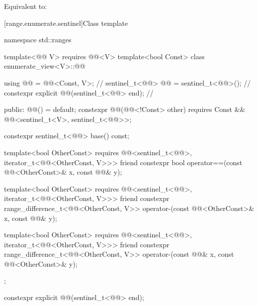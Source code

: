 \begin{itemdescr}
\pnum
\effects
Equivalent to: 
\end{itemdescr}

[range.enumerate.sentinel]{Class template }

%
\begin{codeblock}
namespace std::ranges {
  template<@@ V>
    requires @@<V>
  template<bool Const>
  class enumerate_view<V>::@@ {
    using @@ = @@<Const, V>;                         // \expos
    sentinel_t<@@> @@ = sentinel_t<@@>();                 // \expos
    constexpr explicit @@(sentinel_t<@@> end);          // \expos

  public:
    @@() = default;
    constexpr @@(@@<!Const> other)
      requires Const && @@<sentinel_t<V>, sentinel_t<@@>>;

    constexpr sentinel_t<@@> base() const;

    template<bool OtherConst>
      requires @@<sentinel_t<@@>, iterator_t<@@<OtherConst, V>>>
    friend constexpr bool operator==(const @@<OtherConst>& x, const @@& y);

    template<bool OtherConst>
      requires @@<sentinel_t<@@>, iterator_t<@@<OtherConst, V>>>
    friend constexpr range_difference_t<@@<OtherConst, V>>
      operator-(const @@<OtherConst>& x, const @@& y);

    template<bool OtherConst>
      requires @@<sentinel_t<@@>, iterator_t<@@<OtherConst, V>>>
    friend constexpr range_difference_t<@@<OtherConst, V>>
      operator-(const @@& x, const @@<OtherConst>& y);
  };
}
\end{codeblock}

%
\begin{itemdecl}
constexpr explicit @@(sentinel_t<@@> end);
\end{itemdecl}

